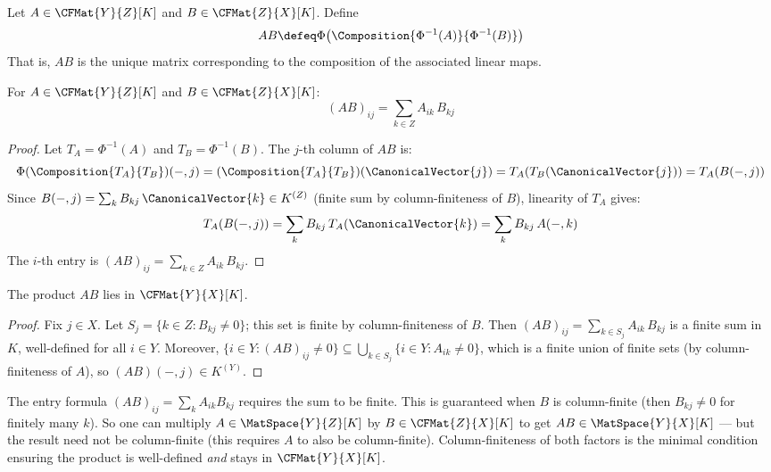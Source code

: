 \begin{definition}
\label{def:mat-mult}
    Let $A \in \CFMat{Y}{Z}[K]$ and $B \in \CFMat{Z}{X}[K]$. Define
    \[
        AB \defeq \Phi\bigl(\Composition{\Phi^{-1}(A)}{\Phi^{-1}(B)}\bigr)
    \]
    That is, $AB$ is the unique matrix corresponding to the composition of the associated
    linear maps.
\end{definition}

\begin{theorem}
\label{thm:entry-formula}
    For $A \in \CFMat{Y}{Z}[K]$ and $B \in \CFMat{Z}{X}[K]$:
    \[
        (AB)_{ij} = \sum_{k \in Z} A_{ik}\, B_{kj}
    \]
\end{theorem}

\begin{proof}
    Let $T_A = \Phi^{-1}(A)$ and $T_B = \Phi^{-1}(B)$. The $j$-th column of $AB$ is:
    \[
        \Phi(\Composition{T_A}{T_B})(-,j)
        = (\Composition{T_A}{T_B})(\CanonicalVector{j})
        = T_A(T_B(\CanonicalVector{j}))
        = T_A(B(-,j))
    \]
    Since $B(-,j) = \sum_k B_{kj}\, \CanonicalVector{k} \in K^{(Z)}$ (finite sum by column-finiteness of
    $B$), linearity of $T_A$ gives:
    \[
        T_A(B(-,j)) = \sum_k B_{kj}\, T_A(\CanonicalVector{k}) = \sum_k B_{kj}\, A(-,k)
    \]
    The $i$-th entry is $(AB)_{ij} = \sum_{k \in Z} A_{ik}\, B_{kj}$.
\end{proof}

\begin{proposition}
\label{prop:mat-mult-wd}
    The product $AB$ lies in $\CFMat{Y}{X}[K]$.
\end{proposition}

\begin{proof}
    Fix $j \in X$. Let $S_j = \{k \in Z : B_{kj} \neq 0\}$; this set is finite by
    column-finiteness of $B$. Then
    $(AB)_{ij} = \sum_{k \in S_j} A_{ik}\, B_{kj}$
    is a finite sum in $K$, well-defined for all $i \in Y$.
    Moreover, $\{i \in Y : (AB)_{ij} \neq 0\}
    \subseteq \bigcup_{k \in S_j} \{i \in Y : A_{ik} \neq 0\}$,
    which is a finite union of finite sets (by column-finiteness of $A$),
    so $(AB)(-,j) \in K^{(Y)}$.
\end{proof}

\begin{remark}
    The entry formula $(AB)_{ij} = \sum_k A_{ik} B_{kj}$ requires the sum to be finite.
    This is guaranteed when $B$ is column-finite (then $B_{kj} \neq 0$ for finitely many $k$).
    So one can multiply $A \in \MatSpace{Y}{Z}[K]$ by $B \in \CFMat{Z}{X}[K]$ to get
    $AB \in \MatSpace{Y}{X}[K]$ --- but the result need not be column-finite (this requires
    $A$ to also be column-finite). Column-finiteness of both factors is the minimal condition
    ensuring the product is well-defined \emph{and} stays in $\CFMat{Y}{X}[K]$.
\end{remark}

